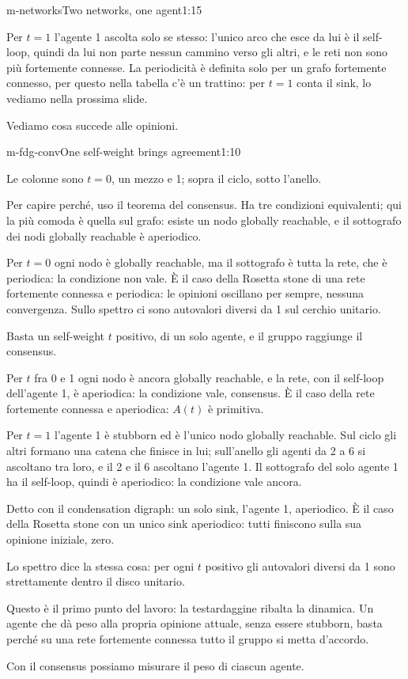 \begin{slidedue}{m-networks}{Two networks, one agent}{1:15}
\begin{discorso}
    \item Per $t=1$ l'agente 1 ascolta solo se stesso: l'unico arco che esce da lui è il self-loop, quindi da lui non parte nessun cammino verso gli altri, e le reti non sono più fortemente connesse. La periodicità è definita solo per un grafo fortemente connesso, per questo nella tabella c'è un trattino: per $t=1$ conta il sink, lo vediamo nella prossima slide.
    \item Vediamo cosa succede alle opinioni.
  \end{discorso}
\end{slidedue}

\begin{slide}{m-fdg-conv}{One self-weight brings agreement}{1:10}
  \begin{discorso}
    \item Le colonne sono $t=0$, un mezzo e 1; sopra il ciclo, sotto l'anello.
    \item Per capire perché, uso il teorema del consensus. Ha tre condizioni equivalenti; qui la più comoda è quella sul grafo: esiste un nodo globally reachable, e il sottografo dei nodi globally reachable è aperiodico.
    \item Per $t=0$ ogni nodo è globally reachable, ma il sottografo è tutta la rete, che è periodica: la condizione non vale. È il caso della Rosetta stone di una rete fortemente connessa e periodica: le opinioni oscillano per sempre, nessuna convergenza. Sullo spettro ci sono autovalori diversi da 1 sul cerchio unitario.
    \item Basta un self-weight $t$ positivo, di un solo agente, e il gruppo raggiunge il consensus.
    \item Per $t$ fra 0 e 1 ogni nodo è ancora globally reachable, e la rete, con il self-loop dell'agente 1, è aperiodica: la condizione vale, consensus. È il caso della rete fortemente connessa e aperiodica: $A(t)$ è primitiva.
    \item Per $t=1$ l'agente 1 è stubborn ed è l'unico nodo globally reachable. Sul ciclo gli altri formano una catena che finisce in lui; sull'anello gli agenti da 2 a 6 si ascoltano tra loro, e il 2 e il 6 ascoltano l'agente 1. Il sottografo del solo agente 1 ha il self-loop, quindi è aperiodico: la condizione vale ancora.
    \item Detto con il condensation digraph: un solo sink, l'agente 1, aperiodico. È il caso della Rosetta stone con un unico sink aperiodico: tutti finiscono sulla sua opinione iniziale, zero.
    \item Lo spettro dice la stessa cosa: per ogni $t$ positivo gli autovalori diversi da 1 sono strettamente dentro il disco unitario.
    \item Questo è il primo punto del lavoro: la testardaggine ribalta la dinamica. Un agente che dà peso alla propria opinione attuale, senza essere stubborn, basta perché su una rete fortemente connessa tutto il gruppo si metta d'accordo.
    \item Con il consensus possiamo misurare il peso di ciascun agente.
  \end{discorso}
\end{slide}

